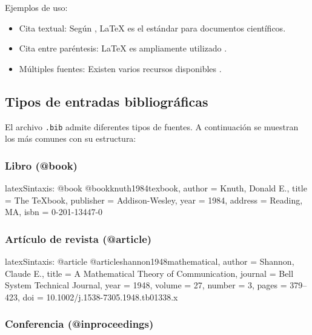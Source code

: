 Ejemplos de uso:
\begin{itemize}
  \item Cita textual: Según \textcite{latex2024}, \LaTeX{} es el estándar para documentos científicos.
  \item Cita entre paréntesis: \LaTeX{} es ampliamente utilizado \parencite{latex2024}.
  \item Múltiples fuentes: Existen varios recursos disponibles \parencite{latex2024,overleaf2024}.
\end{itemize}

\subsection{Tipos de entradas bibliográficas}
\label{subsec:tipos-entradas-bib}

El archivo \texttt{.bib} admite diferentes tipos de fuentes. A continuación
se muestran los más comunes con su estructura:

\subsubsection{Libro (@book)}

\begin{codigosimple}{latex}{Sintaxis: @book}
@book{knuth1984texbook,
  author    = {Knuth, Donald E.},
  title     = {The TeXbook},
  publisher = {Addison-Wesley},
  year      = {1984},
  address   = {Reading, MA},
  isbn      = {0-201-13447-0}
}
\end{codigosimple}

\subsubsection{Artículo de revista (@article)}

\begin{codigosimple}{latex}{Sintaxis: @article}
@article{shannon1948mathematical,
  author  = {Shannon, Claude E.},
  title   = {A Mathematical Theory of Communication},
  journal = {Bell System Technical Journal},
  year    = {1948},
  volume  = {27},
  number  = {3},
  pages   = {379--423},
  doi     = {10.1002/j.1538-7305.1948.tb01338.x}
}
\end{codigosimple}

\subsubsection{Conferencia (@inproceedings)}

